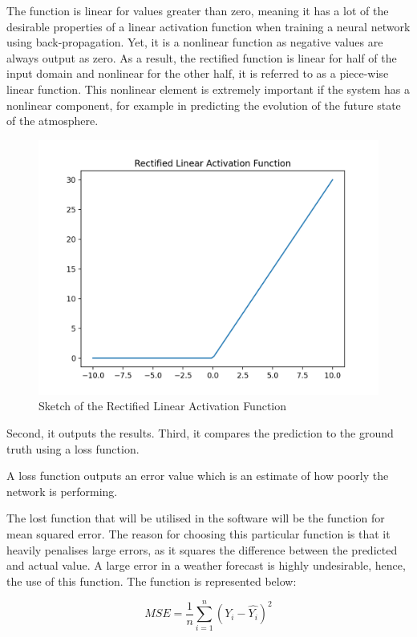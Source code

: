 The function is linear for values greater than zero, meaning it has a lot of the desirable properties of a linear activation function when training a neural network using back-propagation. Yet, it is a nonlinear function as negative values are always output as zero. As a result, the rectified function is linear for half of the input domain and nonlinear for the other half, it is referred to as a piece-wise linear function\cite{relu}. This nonlinear element is extremely important if the system has a nonlinear component, for example in predicting the evolution of the future state of the atmosphere.

\begin{figure}[H]
    \centering
    \includegraphics[width=.65\linewidth]{Images/relu.png}
    \caption{Sketch of the Rectified Linear Activation Function}
\end{figure}

Second, it outputs the results. Third, it compares the prediction to the ground truth using a loss function.

\begin{definition}
A loss function outputs an error value which is an estimate of how poorly the network is performing.
\end{definition}

The lost function that will be utilised in the software will be the function for mean squared error. The reason for choosing this particular function is that it heavily penalises large errors, as it squares the difference between the predicted and actual value. A large error in a weather forecast is highly undesirable, hence, the use of this function. The function is represented below:

\begin{equation}
    MSE = \frac{1}{n}\sum_{i=1}^n(Y_i-\hat{Y_i})^2
\end{equation}

